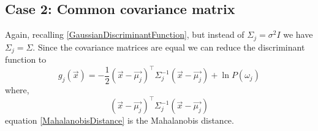 \documentclass[12pt, a4paper]{report}
\begin{document}
	\subsection*{Case 2: Common covariance matrix}
	Again, recalling \eqref{GaussianDiscriminantFunction}, but instead of $\Sigma_j=\sigma^2I$ we have $\Sigma_j=\Sigma$.
	Since the covariance matrices are equal we can reduce the discriminant function to
	\begin{equation}
		g_j(\vec{x}) = -\frac{1}{2}(\vec{x}-\vec{\mu_j})^\intercal\Sigma_j^{-1}(\vec{x}-\vec{\mu_j}) + \ln P(\omega_j)
	\end{equation}
	where,
	\begin{equation}
		(\vec{x}-\vec{\mu_j})^\intercal\Sigma_j^{-1}(\vec{x}-\vec{\mu_j})
		\label{MahalanobisDistance}
	\end{equation}
	equation \eqref{MahalanobisDistance} is the Mahalanobis distance.
	
\end{document}
